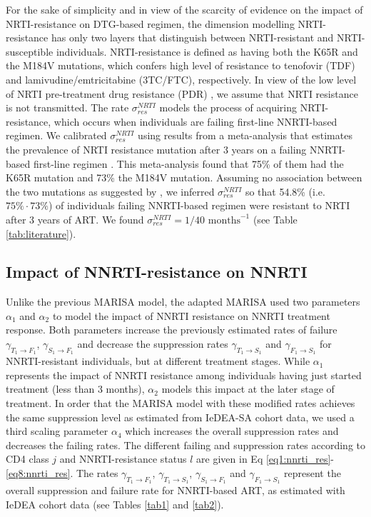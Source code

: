 \documentclass{article}
\begin{document}
For the sake of simplicity and in view of the scarcity of evidence on the impact of NRTI-resistance on DTG-based regimen, the dimension modelling NRTI-resistance has only two layers that distinguish between NRTI-resistant and NRTI-susceptible individuals. NRTI-resistance is defined as having both the K65R and the M184V mutations, which confers high level of resistance to tenofovir (TDF) and lamivudine/emtricitabine (3TC/FTC), respectively.
In view of the low level of NRTI pre-treatment drug resistance (PDR) \cite{rev,Kuhnert2018}, we assume that NRTI resistance is not transmitted. The rate $\sigma^{NRTI}_{res}$ models the process of acquiring NRTI-resistance, which occurs when individuals are failing first-line NNRTI-based regimen. We calibrated $\sigma_{res}^{NRTI}$ using results from a meta-analysis that estimates the prevalence of NRTI resistance mutation after 3 years on a failing NNRTI-based first-line regimen \cite{Hauser_github}. This meta-analysis found that 75\% of them had the K65R mutation and 73\% the M184V mutation. Assuming no association between the two mutations as suggested by \cite{Rhee2017}, we inferred $\sigma_{res}^{NRTI}$ so that 54.8\% (i.e. $75\% \cdot 73\%$) of individuals failing NNRTI-based regimen were resistant to NRTI after 3 years of ART. We found $\sigma_{res}^{NRTI}=1/40\text{ months}^{-1}$ (see Table \ref{tab:literature}).

\subsection{Impact of NNRTI-resistance on NNRTI}\label{sec:nnrti_res}
Unlike the previous MARISA model, the adapted MARISA used two parameters $\alpha_1$ and $\alpha_2$ to model the impact of NNRTI resistance on NNRTI treatment response. Both parameters increase the previously estimated rates of failure $\gamma_{T_1\rightarrow F_1}$, $\gamma_{S_1\rightarrow F_1}$ and decrease the suppression rates $\gamma_{T_1\rightarrow S_1}$ and $\gamma_{F_1\rightarrow S_1}$ for NNRTI-resistant individuals, but at different treatment stages. While $\alpha_1$ represents the impact of NNRTI resistance among individuals having just started treatment (less than 3 months), $\alpha_2$ models this impact at the later stage of treatment. In order that the MARISA model with these modified rates achieves the same suppression level as estimated from IeDEA-SA cohort data, we used a third scaling parameter $\alpha_4$ which increases the overall suppression rates and decreases the failing rates. The different failing and suppression rates according to CD4 class $j$ and NNRTI-resistance status $l$ are given in Eq \ref{eq1:nnrti_res}-\ref{eq8:nnrti_res}. The rates $\gamma_{T_1\rightarrow F_1}$, $\gamma_{T_1\rightarrow S_1}$, $\gamma_{S_1\rightarrow F_1}$ and $\gamma_{F_1\rightarrow S_1}$ represent the overall suppression and failure rate for NNRTI-based ART, as estimated with IeDEA cohort data (see Tables \ref{tab1} and \ref{tab2}).
\end{document}
